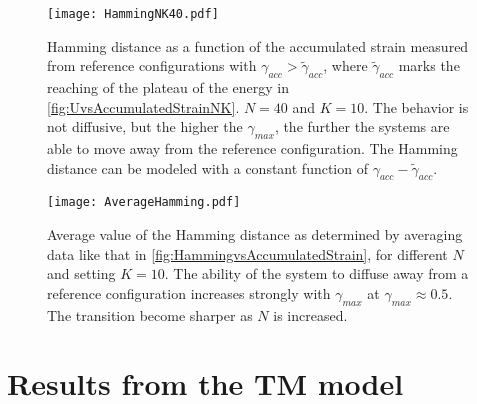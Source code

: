 \begin{figure}
\centering 
\texttt{[image: HammingNK40.pdf]} 
\caption{Hamming distance as a function of the accumulated strain measured from reference configurations with $\gamma_{acc} > \widetilde{\gamma}_{acc}$, where $\widetilde{\gamma}_{acc}$ marks the reaching of the plateau of the energy in \autoref{fig:UvsAccumulatedStrainNK}. $N=40$ and $K=10$. The behavior is not diffusive, but the higher the $\gamma_{max}$, the further the systems are able to move away from the reference configuration. The Hamming distance can be modeled with a constant function of $\gamma_{acc} - \widetilde{\gamma}_{acc}$. \label{fig:HammingvsAccumulatedStrain}}
\end{figure}

\begin{figure}
\centering 
\texttt{[image: AverageHamming.pdf]} 
\caption{Average value of the Hamming distance as determined by averaging data like that in \autoref{fig:HammingvsAccumulatedStrain}, for different $N$ and setting $K=10$. The ability of the system to diffuse away from a reference configuration increases strongly with $\gamma_{max}$ at $\gamma_{max} \approx 0.5$. The transition become sharper as $N$ is increased. \label{fig:AverageHammingvsGammaMax}}
\end{figure}

\pagebreak

\section{Results from the TM model}

